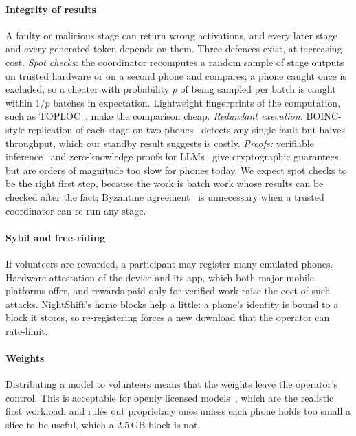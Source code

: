 \documentclass[preprint,review,12pt,authoryear]{elsarticle}
\begin{document}
\paragraph{Integrity of results} A faulty or malicious stage can return wrong
activations, and every later stage and every generated token depends on them.
Three defences exist, at increasing cost. \emph{Spot checks:} the coordinator
recomputes a random sample of stage outputs on trusted hardware or on a second
phone and compares; a phone caught once is excluded, so a cheater with
probability $p$ of being sampled per batch is caught within $1/p$ batches in
expectation. Lightweight fingerprints of the computation, such as
TOPLOC~\citep{toploc}, make the comparison cheap. \emph{Redundant
execution:} BOINC-style replication of each stage on two phones~\citep{boinc}
detects any single fault but halves throughput, which our standby result
suggests is costly. \emph{Proofs:} verifiable inference~\citep{safetynets} and
zero-knowledge proofs for LLMs~\citep{zkllm} give cryptographic guarantees but
are orders of magnitude too slow for phones today. We expect spot checks to be
the right first step, because the work is batch work whose results can be
checked after the fact; Byzantine agreement~\citep{byzantine} is unnecessary
when a trusted coordinator can re-run any stage.

\paragraph{Sybil and free-riding} If volunteers are rewarded, a participant may
register many emulated phones. Hardware attestation of the device and its app,
which both major mobile platforms offer, and rewards paid only for verified
work raise the cost of such attacks. NightShift's home blocks help a little:
a phone's identity is bound to a block it stores, so re-registering forces a
new download that the operator can rate-limit.

\paragraph{Weights} Distributing a model to volunteers means that the weights
leave the operator's control. This is acceptable for openly licensed
models~\citep{llama2,llama3}, which are the realistic first workload, and
rules out proprietary ones unless each phone holds too small a slice to be
useful, which a 2.5\,GB block is not.

\end{document}
